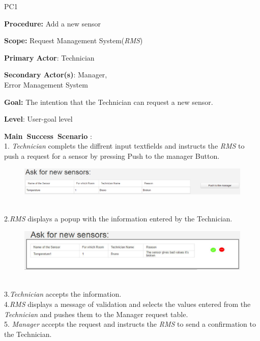 \begin{lyxlist}{PC1}
\small{
\item [\textbf{Procedure:}] Add a new sensor
\item [\textbf{Scope:}] Request Management System(\emph{RMS})
\item [\textbf{Primary Actor}:] Technician
\item [\textbf{Secondary Actor(s)}:] Manager,\\
 Error Management System
\item [\textbf{Goal:}] The intention that the Technician can request a new
sensor.
\item [\textbf{Level}:] User-goal level
\item [\textbf{Main~Success~Scenario}]:\\
1. \emph{Technician} complets the diffrent input textfields and instructs the
\emph{RMS} to push a request for a sensor by pressing Push to the manager Button.
\begin{figure}[h]
\includegraphics[width=1\textwidth]{images/AskForNewSensor.eps}
\end{figure} \\
2.\emph{RMS} displays a popup with the information entered by the Technician.\\
 \begin{figure}[h]
\includegraphics[width=1\textwidth]{images/AskForANewSensorPopUp.eps}
\end{figure}\\

3.\emph{Technician} accepts the information.\\

4.\emph{RMS} displays a message of validation and selects the values entered
from the \emph{Technician} and pushes them to the Manager request table.\\

5. \emph{Manager} accepts the request and instructs the \emph{RMS} to send a
confirmation to the Technician.\\

}
\end{lyxlist}
